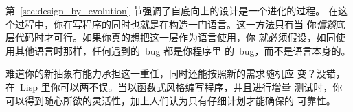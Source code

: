 第~\ref{sec:design_by_evolution} 节强调了自底向上的设计是一个进化的过程。
在这个过程中，你在写程序的同时也就是在构造一门语言。这一方法只有当
你\emph{信赖}底层代码时才可行。如果你真的想把这一层作为语言使用，你
就必须假设，如同使用其他语言时那样，任何遇到的~bug 都是你程序里
的~bug，而不是语言本身的。

难道你的新抽象有能力承担这一重任，同时还能按照新的需求随机应
变？没错，在~Lisp 里你可以两不误。当以函数式风格编写程序，并且进行增量
测试时，你可以得到随心所欲的灵活性，加上人们认为只有仔细计划才能确保的
可靠性。

